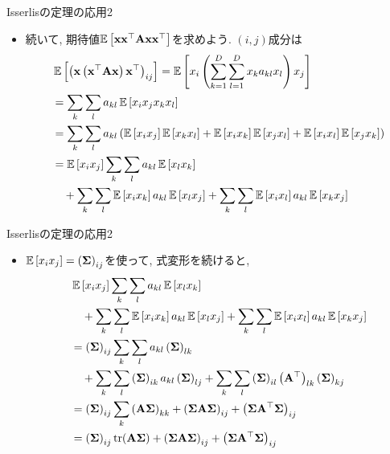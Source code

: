 \documentclass[dvipdfmx,notheorems,t]{beamer}
\begin{document}
\begin{frame}{Isserlisの定理の応用2}
\begin{itemize}
  \item 続いて, 期待値$\operatorname{\mathbb{E}} \left[ \vb{x} \vb{x}^\top \vb{A} \vb{x} \vb{x}^\top \right]$を求めよう. $(i, j)$成分は
  \begin{align*}
    & \operatorname{\mathbb{E}} \left[ \left( \vb{x} \left( \vb{x}^\top \vb{A} \vb{x} \right) \vb{x}^\top \right)_{ij} \right]
    = \operatorname{\mathbb{E}} \left[ x_i \left( \sum_{k = 1}^D \sum_{l = 1}^D x_k a_{kl} x_l \right) x_j \right] \\
    &= \sum_k \sum_l a_{kl} \operatorname{\mathbb{E}} \left[ x_i x_j x_k x_l \right] \\
    &= \sum_k \sum_l a_{kl} \left( \operatorname{\mathbb{E}} \left[ x_i x_j \right] \operatorname{\mathbb{E}} \left[ x_k x_l \right]
      + \operatorname{\mathbb{E}} \left[ x_i x_k \right] \operatorname{\mathbb{E}} \left[ x_j x_l \right] + \operatorname{\mathbb{E}} \left[ x_i x_l \right] \operatorname{\mathbb{E}} \left[ x_j x_k \right] \right) \\
    &= \operatorname{\mathbb{E}} \left[ x_i x_j \right] \sum_k \sum_l a_{kl} \operatorname{\mathbb{E}} \left[ x_l x_k \right] \\
    & \quad + \sum_k \sum_l \operatorname{\mathbb{E}} \left[ x_i x_k \right] a_{kl} \operatorname{\mathbb{E}} \left[ x_l x_j \right]
      + \sum_k \sum_l \operatorname{\mathbb{E}} \left[ x_i x_l \right] a_{kl} \operatorname{\mathbb{E}} \left[ x_k x_j \right]
  \end{align*}
\end{itemize}
\end{frame}

\begin{frame}{Isserlisの定理の応用2}
\begin{itemize}
  \item $\operatorname{\mathbb{E}} \left[ x_i x_j \right] = \left( \vb{\Sigma} \right)_{ij}$を使って, 式変形を続けると,
  \begin{align*}
    & \operatorname{\mathbb{E}} \left[ x_i x_j \right] \sum_k \sum_l a_{kl} \operatorname{\mathbb{E}} \left[ x_l x_k \right] \\
    & \quad + \sum_k \sum_l \operatorname{\mathbb{E}} \left[ x_i x_k \right] a_{kl} \operatorname{\mathbb{E}} \left[ x_l x_j \right]
      + \sum_k \sum_l \operatorname{\mathbb{E}} \left[ x_i x_l \right] a_{kl} \operatorname{\mathbb{E}} \left[ x_k x_j \right] \\
    &= \left( \vb{\Sigma} \right)_{ij} \sum_k \sum_l a_{kl} \left( \vb{\Sigma} \right)_{lk} \\
    & \quad + \sum_k \sum_l \left( \vb{\Sigma} \right)_{ik} a_{kl} \left( \vb{\Sigma} \right)_{lj}
      + \sum_k \sum_l \left( \vb{\Sigma} \right)_{il}
      \left( \vb{A}^\top \right)_{lk} \left( \vb{\Sigma} \right)_{kj} \\
    &= \left( \vb{\Sigma} \right)_{ij} \sum_k \left( \vb{A} \vb{\Sigma} \right)_{kk}
      + \left( \vb{\Sigma} \vb{A} \vb{\Sigma} \right)_{ij}
      + \left( \vb{\Sigma} \vb{A}^\top \vb{\Sigma} \right)_{ij} \\
    &= \left( \vb{\Sigma} \right)_{ij} \tr(\vb{A} \vb{\Sigma})
      + \left( \vb{\Sigma} \vb{A} \vb{\Sigma} \right)_{ij}
      + \left( \vb{\Sigma} \vb{A}^\top \vb{\Sigma} \right)_{ij}
  \end{align*}
\end{itemize}
\end{frame}
\end{document}
